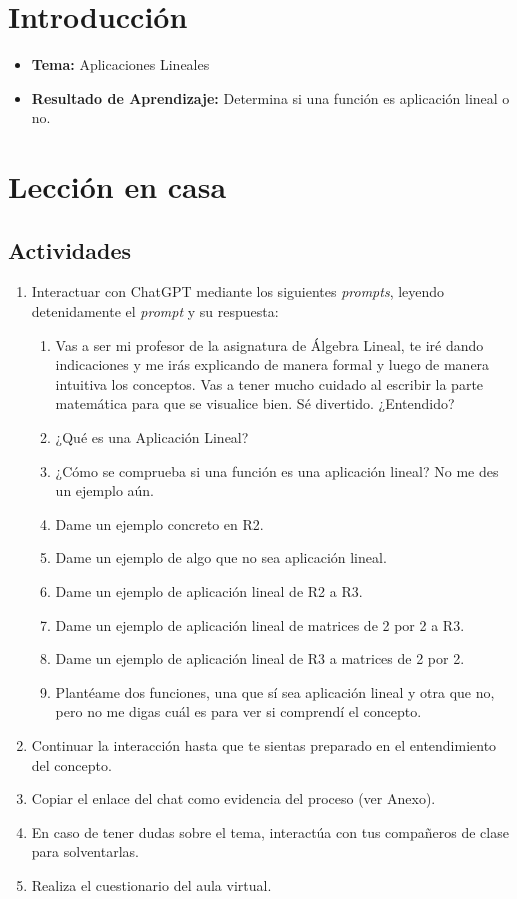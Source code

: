 \documentclass[a4,11pt]{aleph-notas}
\begin{document}
\encabezado


\section*{Introducción}

\begin{itemize}
    \item \textbf{Tema:} Aplicaciones Lineales
    \item \textbf{Resultado de Aprendizaje:} Determina si una función es aplicación lineal o no.
\end{itemize}

\section*{Lección en casa}

\subsection*{Actividades}

\begin{enumerate}[leftmargin=*]
    \item Interactuar con ChatGPT mediante los siguientes \textit{prompts}, leyendo detenidamente el \textit{prompt} y su respuesta:
    \begin{enumerate}[label=\textit{Prompt \arabic*.},leftmargin=2.1cm]
        \item Vas a ser mi profesor de la asignatura de Álgebra Lineal, te iré dando indicaciones y me irás explicando de manera formal y luego de manera intuitiva los conceptos. Vas a tener mucho cuidado al escribir la parte matemática para que se visualice bien. Sé divertido. ¿Entendido?
        \item ¿Qué es una Aplicación Lineal?
        \item ¿Cómo se comprueba si una función es una aplicación lineal? No me des un ejemplo aún.
        \item Dame un ejemplo concreto en R2.
        \item Dame un ejemplo de algo que no sea aplicación lineal.
        \item Dame un ejemplo de aplicación lineal de R2 a R3.
        \item Dame un ejemplo de aplicación lineal de matrices de 2 por 2 a R3.
        \item Dame un ejemplo de aplicación lineal de R3 a matrices de 2 por 2.
        \item Plantéame dos funciones, una que sí sea aplicación lineal y otra que no, pero no me digas cuál es para ver si comprendí el concepto.
    \end{enumerate}
    \item Continuar la interacción hasta que te sientas preparado en el entendimiento del concepto.
    \item Copiar el enlace del chat como evidencia del proceso (ver Anexo).
    \item En caso de tener dudas sobre el tema, interactúa con tus compañeros de clase para solventarlas.
    \item Realiza el cuestionario del aula virtual.
\end{enumerate}
\end{document}
